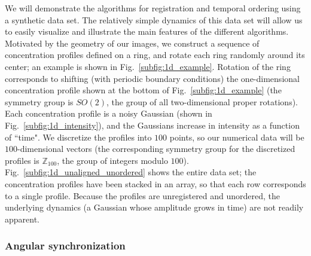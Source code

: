 \documentclass{pnastwo}
\newcommand{\fig}[0]{Fig.}
\begin{document}
\begin{article}
We will demonstrate the algorithms for registration and temporal ordering using a synthetic data set.
%
The relatively simple dynamics of this data set will allow us to easily visualize and illustrate the main features of the different algorithms.
%
Motivated by the geometry of our images, we construct a sequence of concentration profiles defined on a ring, and rotate each ring randomly around its center; an example is shown in \fig~\ref{subfig:1d_example}.
%
Rotation of the ring corresponds to shifting (with periodic boundary conditions) the one-dimensional concentration profile shown at the bottom of \fig~\ref{subfig:1d_example} (the symmetry group is $SO(2)$, the group of all two-dimensional proper rotations).
%
Each concentration profile is a noisy Gaussian (shown in \fig~\ref{subfig:1d_intensity}), and the Gaussians increase in intensity as a function of ``time".
%
We discretize the profiles into $100$ points, so our numerical data will be $100$-dimensional vectors (the corresponding symmetry group for the discretized profiles is $\mathbb{Z}_{100}$, the group of integers modulo $100$).
%
\fig~\ref{subfig:1d_unaligned_unordered} shows the entire data set; the concentration profiles have been stacked in an array, so that each row corresponds to a single profile.
%
Because the profiles are unregistered and unordered, the underlying dynamics (a Gaussian whose amplitude grows in time) are not readily apparent.



\subsubsection{Angular synchronization \cite{singer2011angular}}


\end{article}
\end{document}
